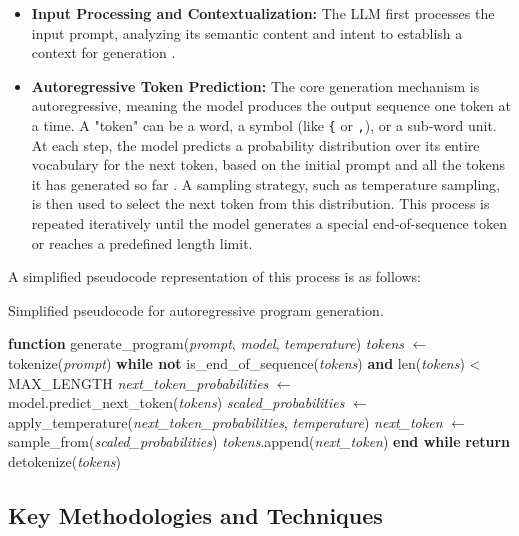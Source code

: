 \documentclass[12pt, a4paper]{report}
\begin{document}
\begin{itemize}
    \item \textbf{Input Processing and Contextualization:} The LLM first processes the input prompt, analyzing its semantic content and intent to establish a context for generation \citep{brown2020language}.
    \item \textbf{Autoregressive Token Prediction:} The core generation mechanism is autoregressive, meaning the model produces the output sequence one token at a time. A "token" can be a word, a symbol (like \texttt{\{} or \texttt{,}), or a sub-word unit. At each step, the model predicts a probability distribution over its entire vocabulary for the next token, based on the initial prompt and all the tokens it has generated so far \citep{brown2020language}. A sampling strategy, such as temperature sampling, is then used to select the next token from this distribution. This process is repeated iteratively until the model generates a special end-of-sequence token or reaches a predefined length limit.
\end{itemize}

A simplified pseudocode representation of this process is as follows:
\begin{algorithm}
\caption{Simplified pseudocode for autoregressive program generation.}
\label{alg:llm_generation}
\begin{algorithmic}[1]
\STATE \textbf{function} generate\_program(\textit{prompt}, \textit{model}, \textit{temperature})
\STATE \quad \textit{tokens} $\leftarrow$ tokenize(\textit{prompt}) 
\STATE \quad \textbf{while not} is\_end\_of\_sequence(\textit{tokens}) \textbf{and} len(\textit{tokens}) < MAX\_LENGTH
\STATE \quad \quad \textit{next\_token\_probabilities} $\leftarrow$ model.predict\_next\_token(\textit{tokens})
\STATE \quad \quad \textit{scaled\_probabilities} $\leftarrow$ apply\_temperature(\textit{next\_token\_probabilities}, \textit{temperature})
\STATE \quad \quad \textit{next\_token} $\leftarrow$ sample\_from(\textit{scaled\_probabilities})
\STATE \quad \quad \textit{tokens}.append(\textit{next\_token})
\STATE \quad \textbf{end while}
\STATE \quad \textbf{return} detokenize(\textit{tokens}) 
\end{algorithmic}
\end{algorithm}

\subsection{Key Methodologies and Techniques}
\end{document}
